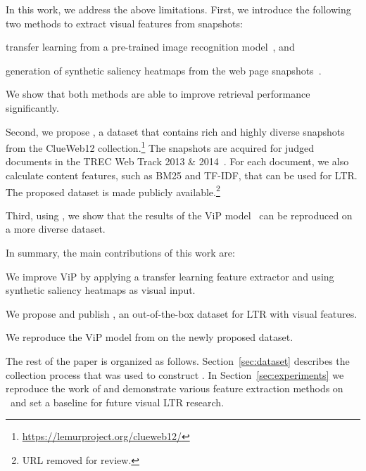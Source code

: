 In this work, we address the above limitations.
First, we introduce the following two methods to extract visual features from snapshots:
\begin{inparaenum}[(i)]
\item transfer learning from a pre-trained image recognition model~\cite{donahue2014decaf,simonyan2014very}, and
\item generation of synthetic saliency heatmaps from the web page snapshots~\cite{shen2014webpage,shan2017two}.
\end{inparaenum}
We show that both methods are able to improve retrieval performance significantly.

Second, we propose \datasetname, a dataset that contains rich and highly diverse snapshots from the ClueWeb12 collection.\footnote{\url{https://lemurproject.org/clueweb12/}} The snapshots are acquired for judged documents in the TREC Web Track 2013 \& 2014~\cite{collins2013trec,collins2015trec}. For each document, we also calculate content features, such as BM25 and TF-IDF, that can be used for \ac{LTR}.
The proposed dataset is made publicly available.\footnote{URL removed for review.}

%
Third, using \datasetname, we show that the results of the ViP model~\citep{fan2017learning} can be reproduced on a more diverse dataset.

In summary, the main contributions of this work are:
\begin{inparaenum}[(i)]
\item We improve ViP by applying a transfer learning feature extractor and using synthetic saliency heatmaps as visual input. 
\item We propose and publish \datasetname, an out-of-the-box dataset for \ac{LTR} with visual features.
\item We reproduce the ViP model from \cite{fan2017learning} on the newly proposed dataset.
\end{inparaenum}
 The rest of the paper is organized as follows. Section~\ref{sec:dataset} describes the collection process that was used to construct \datasetname. In Section~\ref{sec:experiments} we reproduce the work of \citet{fan2017learning} and demonstrate various feature extraction methods on \datasetname~and set a baseline for future visual \ac{LTR} research.  
\fi